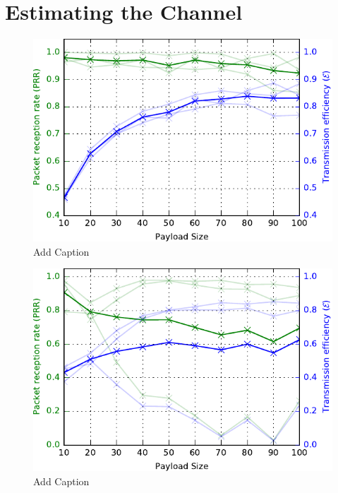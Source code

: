 \section{Estimating the Channel\label{sec:chanEst}}

\begin{figure}
\centering
\includegraphics[scale=1]{figs/35mTest.pdf} 
\caption{Add Caption\label{fig:35mTest}}
\end{figure}
\begin{figure}
\centering
\includegraphics[scale=1]{figs/45mTest.pdf} 
\caption{Add Caption\label{fig:45mTest}}
\end{figure}